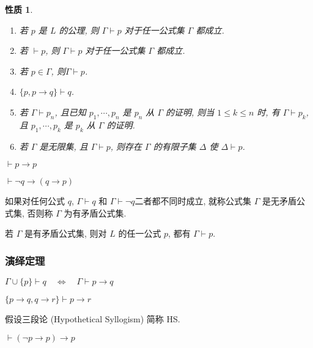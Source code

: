 \documentclass[
    color=black,
    device=normal,
    lang=cn
]{elegantnote}
\newtheorem{quality}{性质}[subsection]
\begin{document}
\begin{quality}
    \begin{enumerate}[label = $\arabic*^\circ$, topsep = -1em]
        \item 若 $p$ 是 $L$ 的公理, 则 $\Gamma\vdash p$ 对于任一公式集 $\Gamma$ 都成立.
        \item 若 $\vdash p$, 则 $\Gamma\vdash p$ 对于任一公式集 $\Gamma$ 都成立.
        \item 若 $p\in\Gamma$, 则$\Gamma\vdash p$.
        \item $\{p,p\to q\}\vdash q$.
        \item 若 $\Gamma\vdash p_n$, 且已知 $p_1,\cdots, p_n$ 是 $p_n$ 从 $\Gamma$ 的证明, 则当 $1\leq k\leq n$ 时, 有 $\Gamma \vdash p_k$, 且 $p_1, \cdots, p_k$ 是 $p_k$ 从 $\Gamma$ 的证明.
        \item 若 $\Gamma$ 是无限集, 且 $\Gamma\vdash p$, 则存在 $\Gamma$ 的有限子集 $\Delta$ 使 $\Delta\vdash p$.
    \end{enumerate}
\end{quality}
\begin{proposition}[同一律]
    $\vdash p\to p$
\end{proposition}
\begin{proposition}[否定前件律]
    $\vdash\lnot q\to(q\to p)$
\end{proposition}
\begin{definition}[无矛盾公式集]
    如果对任何公式 $q$, $\Gamma\vdash q$ 和 $\Gamma\vdash\lnot q$二者都不同时成立, 就称公式集 $\Gamma$ 是无矛盾公式集, 否则称 $\Gamma$ 为有矛盾公式集.
\end{definition}
\begin{proposition}
    若 $\Gamma$ 是有矛盾公式集, 则对 $L$ 的任一公式 $p$, 都有 $\Gamma\vdash p$.
\end{proposition}
\subsubsection{演绎定理}
\begin{theorem}[演绎定理]
    $\Gamma \cup \{p\}\vdash q\quad\Leftrightarrow\quad \Gamma\vdash p\to q$
\end{theorem}
\begin{lemma}[假设三段论]
    $\{p\to q,q\to r\}\vdash p\to r$
\end{lemma}
假设三段论 (Hypothetical Syllogism) 简称 HS.

\begin{proposition}[否定肯定律]
    $\vdash (\lnot p\to p)\to p$
\end{proposition}
\end{document}
